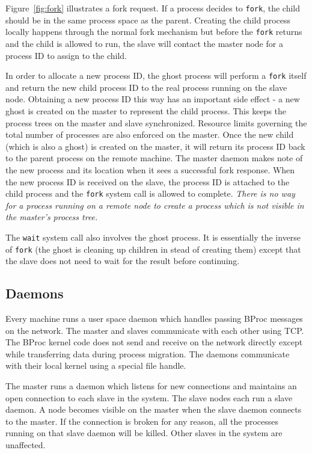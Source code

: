 Figure~\ref{fig:fork} illustrates a fork request.  If a process
decides to \texttt{fork}, the child should be in the same process
space as the parent.  Creating the child process locally happens
through the normal fork mechanism but before the \texttt{fork} returns
and the child is allowed to run, the slave will contact the master
node for a process ID to assign to the child.

In order to allocate a new process ID, the ghost process will perform
a \texttt{fork} itself and return the new child process ID to the real
process running on the slave node.  Obtaining a new process ID this
way has an important side effect - a new ghost is created on the
master to represent the child process. This keeps the process trees on
the master and slave synchronized.  Resource limits governing the
total number of processes are also enforced on the master.  Once
the new child (which is also a ghost) is created on the master, it
will return its process ID back to the parent process on the remote
machine.  The master daemon makes note of the new process and its
location when it sees a successful fork response.  When the new
process ID is received on the slave, the process ID is attached to the
child process and the \texttt{fork} system call is allowed to
complete.  \emph{There is no way for a process running on a remote
node to create a process which is not visible in the master's process
tree.}

The \texttt{wait} system call also involves the ghost process.  It is
essentially the inverse of \texttt{fork} (the ghost is cleaning up
children in stead of creating them) except that the slave does not
need to wait for the result before continuing.


\subsection{Daemons}

Every machine runs a user space daemon which handles passing BProc
messages on the network. The master and slaves communicate with each
other using TCP. The BProc kernel code does not send and receive on
the network directly except while transferring data during process
migration.  The daemons communicate with their local kernel using a
special file handle.


The master runs a daemon which listens for new connections and
maintains an open connection to each slave in the system.  The slave
nodes each run a slave daemon.  A node becomes visible on the master
when the slave daemon connects to the master.  If the connection is
broken for any reason, all the processes running on that slave daemon
will be killed.  Other slaves in the system are unaffected.

